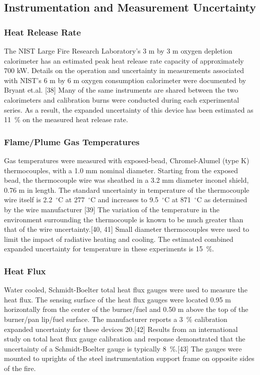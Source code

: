 \documentclass[twoside]{uocthesis}
\begin{document}
\subsection{Instrumentation and Measurement Uncertainty}

\subsubsection{Heat Release Rate}

The NIST Large Fire Research Laboratory’s 3 m by 3 m oxygen depletion calorimeter has an estimated peak heat release rate capacity of approximately 700 kW.  Details on the operation and uncertainty in measurements associated with NIST’s 6 m by 6 m oxygen consumption calorimeter were documented by Bryant et.al. [38] Many of the same instruments are shared between the two calorimeters and calibration burns were conducted during each experimental series.  As a result, the expanded uncertainty of this device has been estimated as 11~\% on the measured heat release rate.

\subsubsection{Flame/Plume Gas Temperatures}

Gas temperatures were measured with exposed-bead, Chromel-Alumel (type K) thermocouples, with a 1.0 mm nominal diameter.  Starting from the exposed bead, the thermocouple wire was sheathed in a 3.2 mm diameter inconel shield, 0.76 m in length.  The standard uncertainty in temperature of the thermocouple wire itself is 2.2~$^\circ$C at 277~$^\circ$C and increases to 9.5~$^\circ$C at 871~$^\circ$C as determined by the wire manufacturer [39]  The variation of the temperature in the environment surrounding the thermocouple is known to be much greater than that of the wire uncertainty.[40, 41]  Small diameter thermocouples were used to limit the impact of radiative heating and cooling.  The estimated combined expanded uncertainty for temperature in these experiments is 15~\%.

\subsubsection{Heat Flux}

Water cooled, Schmidt-Boelter total heat flux gauges were used to measure the heat flux. The sensing surface of the heat flux gauges were located 0.95 m horizontally from the center of the burner/fuel and 0.50 m above the top of the burner/pan lip/fuel surface.  The manufacturer reports a 3~\% calibration expanded uncertainty for these devices 20.[42] Results from an international study on total heat flux gauge calibration and response demonstrated that the uncertainty of a Schmidt-Boelter gauge is typically 8~\%.[43]  The gauges were mounted to uprights of the steel instrumentation support frame on opposite sides of the fire.
\end{document}
